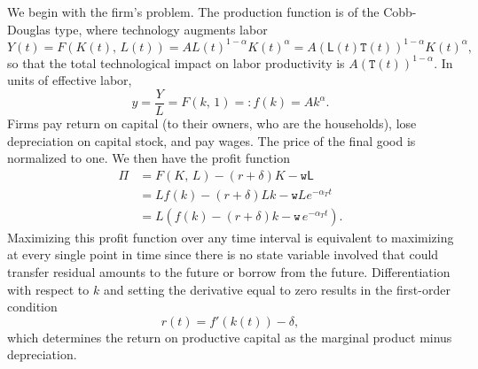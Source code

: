 \documentclass[10pt]{article}
\begin{document}
\smallskip

We begin with the firm's problem.  The production function is of the Cobb-Douglas type, where technology augments labor
\[
Y(t) = F(K(t),\, L(t)) = A L(t)^{1-\alpha} K(t)^{\alpha} = A (\mathsf{L}(t)\mathtt{T}(t))^{1-\alpha} K(t)^{\alpha},
\]
so that the total technological impact on labor productivity is $A(\mathtt{T}(t))^{1-\alpha}$.  In units of effective labor,
\[
y = \frac{Y}{L} = F(k,\, 1) =: f(k) = A k^\alpha.
\]
Firms pay return on capital (to their owners, who are the households), lose depreciation on capital stock, and pay wages.  The price of the final good is normalized to one. We then have the profit function
\begin{align*}
\Pi &= F(K,\, L) - (r+\delta) K - \mathtt{w}\mathsf{L}\\
 &= L f(k) - (r+\delta) Lk - \mathtt{w}Le^{-\alpha_T t}\\
 &= L \left( f(k) - (r+\delta) k - \mathtt{w}\, e^{-\alpha_T t} \right).
\end{align*}
Maximizing this profit function over any time interval is equivalent to maximizing at every single point in time since there is no state variable involved that could transfer residual amounts to the future or borrow from the future.  Differentiation with respect to $k$ and setting the derivative equal to zero results in the first-order condition
\begin{equation}\label{Eq:RamseyFirms1}
r(t) = f'(k(t)) - \delta,
\end{equation}
which determines the return on productive capital as the marginal product minus depreciation.

\smallskip
\end{document}
